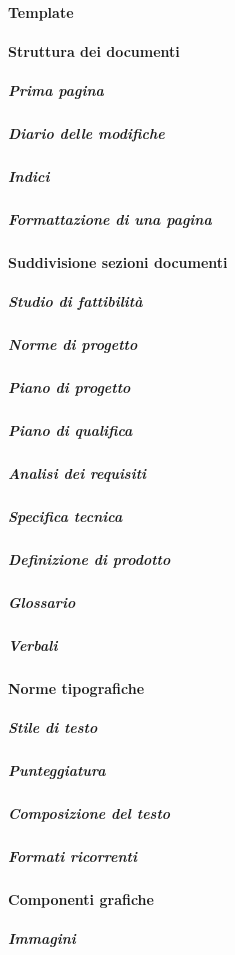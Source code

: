 			\paragraph{Template}

			\paragraph{Struttura dei documenti}
				
				\subparagraph{Prima pagina}
				
				\subparagraph{Diario delle modifiche}
				
				\subparagraph{Indici}
				
				\subparagraph{Formattazione di una pagina}

			\paragraph{Suddivisione sezioni documenti}
				
				\subparagraph{Studio di fattibilità}
				
				\subparagraph{Norme di progetto}
				
				\subparagraph{Piano di progetto}
				
				\subparagraph{Piano di qualifica}
				
				\subparagraph{Analisi dei requisiti}
				
				\subparagraph{Specifica tecnica}
				
				\subparagraph{Definizione di prodotto}
				
				\subparagraph{Glossario}
				
				\subparagraph{Verbali}

			\paragraph{Norme tipografiche}
				
				\subparagraph{Stile di testo}
				
				\subparagraph{Punteggiatura}
				
				\subparagraph{Composizione del testo}
				
				\subparagraph{Formati ricorrenti}

			\paragraph{Componenti grafiche}
				
				\subparagraph{Immagini}
				
